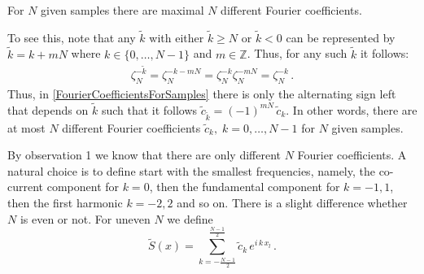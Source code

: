 \documentclass[a4paper, 10pt]{article}
\begin{document}
{\vspace{0.5cm}


 For $N$ given samples there are maximal $N$ different Fourier coefficients.

To see this, note that any $\tilde k$ with either $\tilde k \geq N$ or $\tilde k < 0$ can be represented by $\tilde k = k+ mN$ where $k\in \{0,\dots,N-1\}$ and $m\in \mathbb Z$. Thus, for any such $\tilde k$ it follows:
\begin{eqnarray*}
\zeta^{-\tilde k}_N =  \zeta^{-k - mN}_N = \zeta^{-k}_N \zeta^{-mN}_N = \zeta^{-k}_N \,.
\end{eqnarray*}
Thus, in \eqref{FourierCoefficientsForSamples} there is only the alternating sign left that depends on $\tilde k$ such that it follows $\tilde c_{\tilde k} = (-1)^{mN}\, \tilde c_k$. In other words, there are at most $N$ different Fourier coefficients $ \tilde c_k, \; k=0, \dots, N-1$ for $N$ given samples.


\vspace{0.5cm}



By observation 1 we know that there are only different $N$ Fourier coefficients. A natural choice is to define start with the smallest frequencies, namely, the co-current component for $k=0$, then the fundamental component for $k=-1, 1$, then the first harmonic $k=-2,2$ and so on. There is a slight difference whether $N$ is even or not. For uneven $N$ we define
\begin{equation} \label{FourierPolynom}
\tilde S(x) = \sum\limits_{k=-\frac{N-1}{2}}^{\frac{N-1}{2}} \tilde c_k \, e^{i\,k\,x_l}\,.
\end{equation}

}
\end{document}
